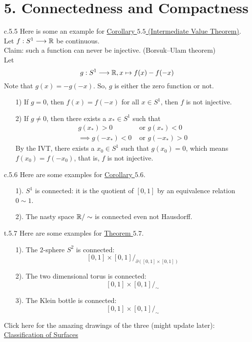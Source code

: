 \section*{5. Connectedness and Compactness}

\begin{customexa}{c.5.5} Here is some an example for \hypertarget{ex.c.5.5}{\hyperlink{Corollary_5.5}{Corollary $5.5$ (Intermediate Value Theorem)}}.\\
Let $f: S^1 \longrightarrow \mathbb{R}$ be continuous.\\
Claim: such a function can never be injective. (Borsuk–Ulam theorem)\\
Let 
$$g:S^1 \longrightarrow \mathbb{R}, x \mapsto f(x) - f(-x)$$
Note that $g(x) = -g(-x)$. So, $g$ is either the zero function or not.
    \begin{enumerate}
        \item[1)] If $g = 0$, then $f(x) = f(-x)$ for all $x \in S^1$, then $f$ is not injective.
        \item[2)] If $g \neq 0$, then there exists a $x_* \in S^1$ such that 
        \begin{align*}
            g(x_*) > 0 &\text{ or } g(x_*) < 0\\
            \implies g( -x_*) < 0 &\text{ or } g(-x_*) > 0
        \end{align*}
        By the IVT, there exists a $x_0 \in S^1$ such that $g(x_0) = 0$, which means $f(x_0) = f(-x_0)$, that is, $f$ is not injective.
    \end{enumerate}
\end{customexa}

\begin{customexa}{c.5.6} Here are some examples for \hypertarget{ex.c.5.6}{\hyperlink{Corollary_5.6}{Corollary $5.6$}}.
\begin{enumerate}
    \item[1).] $S^1$ is connected: it is the quotient of $[0,1]$ by an equivalence relation $0 \sim 1$.
    \item[2).] The nasty space $\mathbb{R}/\sim$ is connected even not Hausdorff.
\end{enumerate}
\end{customexa}

\begin{customexa}{t.5.7} Here are some examples for \hypertarget{ex.t.5.7}{\hyperlink{Theorem_5.7}{Theorem $5.7$}}.
\begin{enumerate}
    \item[1).] The $2$-sphere $S^2$ is connected:
    $$[0,1] \times [0,1] /_{\partial\left([0,1] \times [0,1]\right)}$$
    \item[2).] The two dimensional torus is connected:
    $$[0,1] \times [0,1] /_{\sim}$$
    \item[3).] The Klein bottle is connected:
    $$[0,1] \times [0,1] /_{\sim}$$
\end{enumerate}
Click here for the amazing drawings of the three (might update later): \href{https://en.wikipedia.org/wiki/Surface_(topology)}{Classification of Surfaces}
\end{customexa}

